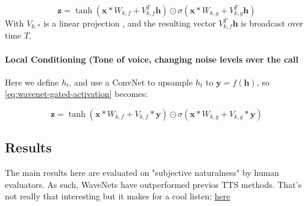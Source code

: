 \begin{equation}
    \mathbf{z} = \tanh ( \mathbf{x} * W_{k, f} + V^T_{k, f}\mathbf{h}) \odot \sigma ( \mathbf{x} * W_{k, g} + V^T_{k, g}\mathbf{h})
\end{equation}
With \(V_{k, *}\) is a linear projection , and the resulting vector \(V^T_{k, f}\mathbf{h}\) is broadcast over time \(T\).


\paragraph{Local Conditioning (Tone of voice, changing noise levels over the call}
Here we define \(h_t\), and use a ConvNet to upsample \(h_t\) to \(\mathbf{y} = f(\mathbf{h})\), so \cref{eq:wavenet-gated-activation} becomes:

\begin{equation}
    \mathbf{z} = \tanh ( \mathbf{x} * W_{k, f} + V_{k, f}*\mathbf{y}) \odot \sigma ( \mathbf{x} * W_{k, g} + V_{k, g}*\mathbf{y})
\end{equation}

\subsection{Results}

The main results here are evaluated on "subjective naturalness" by human evaluators. 
As such, WaveNets have outperformed previos TTS methods.
That's not really that interesting but it makes for a cool listen: \href{https://deepmind.com/blog/article/wavenet-generative-model-raw-audio}{here}